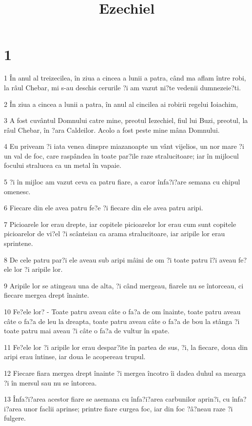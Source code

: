 

\title{Ezechiel}


\chapter{1}

\par 1 În anul al treizecilea, în ziua a cincea a lunii a patra, când ma aflam între robi, la râul Chebar, mi s-au deschis cerurile ?i am vazut ni?te vedenii dumnezeie?ti.
\par 2 În ziua a cincea a lunii a patra, în anul al cincilea ai robirii regelui Ioiachim,
\par 3 A fost cuvântul Domnului catre mine, preotul Iezechiel, fiul lui Buzi, preotul, la râul Chebar, în ?ara Caldeilor. Acolo a fost peste mine mâna Domnului.
\par 4 Eu priveam ?i iata venea dinspre miazanoapte un vânt vijelios, un nor mare ?i un val de foc, care raspândea în toate par?ile raze stralucitoare; iar în mijlocul focului stralucea ca un metal în vapaie.
\par 5 ?i în mijloc am vazut ceva ca patru fiare, a caror înfa?i?are semana cu chipul omenesc.
\par 6 Fiecare din ele avea patru fe?e ?i fiecare din ele avea patru aripi.
\par 7 Picioarele lor erau drepte, iar copitele picioarelor lor erau cum sunt copitele picioarelor de vi?el ?i scânteiau ca arama stralucitoare, iar aripile lor erau sprintene.
\par 8 De cele patru par?i ele aveau sub aripi mâini de om ?i toate patru î?i aveau fe?ele lor ?i aripile lor.
\par 9 Aripile lor se atingeau una de alta, ?i când mergeau, fiarele nu se întorceau, ci fiecare mergea drept înainte.
\par 10 Fe?ele lor? - Toate patru aveau câte o fa?a de om înainte, toate patru aveau câte o fa?a de leu la dreapta, toate patru aveau câte o fa?a de bou la stânga ?i toate patru mai aveau ?i câte o fa?a de vultur în spate.
\par 11 Fe?ele lor ?i aripile lor erau despar?ite în partea de sus, ?i, la fiecare, doua din aripi erau întinse, iar doua le acopereau trupul.
\par 12 Fiecare fiara mergea drept înainte ?i mergea încotro îi dadea duhul sa mearga ?i în mersul sau nu se întorcea.
\par 13 Înfa?i?area acestor fiare se asemana cu înfa?i?area carbunilor aprin?i, cu înfa?i?area unor faclii aprinse; printre fiare curgea foc, iar din foc ?â?neau raze ?i fulgere.
